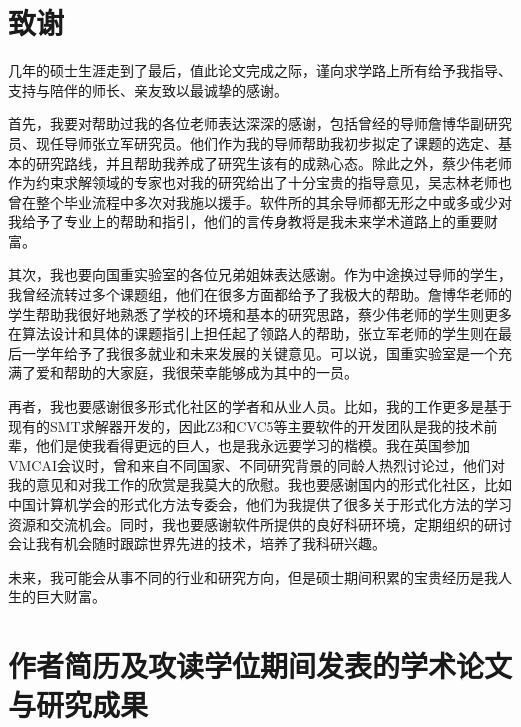 \chapter[致谢]{致\quad 谢}%

几年的硕士生涯走到了最后，值此论文完成之际，谨向求学路上所有给予我指导、支持与陪伴的师长、亲友致以最诚挚的感谢。

首先，我要对帮助过我的各位老师表达深深的感谢，包括曾经的导师詹博华副研究员、现任导师张立军研究员。他们作为我的导师帮助我初步拟定了课题的选定、基本的研究路线，并且帮助我养成了研究生该有的成熟心态。除此之外，蔡少伟老师作为约束求解领域的专家也对我的研究给出了十分宝贵的指导意见，吴志林老师也曾在整个毕业流程中多次对我施以援手。软件所的其余导师都无形之中或多或少对我给予了专业上的帮助和指引，他们的言传身教将是我未来学术道路上的重要财富。

其次，我也要向国重实验室的各位兄弟姐妹表达感谢。作为中途换过导师的学生，我曾经流转过多个课题组，他们在很多方面都给予了我极大的帮助。詹博华老师的学生帮助我很好地熟悉了学校的环境和基本的研究思路，蔡少伟老师的学生则更多在算法设计和具体的课题指引上担任起了领路人的帮助，张立军老师的学生则在最后一学年给予了我很多就业和未来发展的关键意见。可以说，国重实验室是一个充满了爱和帮助的大家庭，我很荣幸能够成为其中的一员。

再者，我也要感谢很多形式化社区的学者和从业人员。比如，我的工作更多是基于现有的SMT求解器开发的，因此Z3和CVC5等主要软件的开发团队是我的技术前辈，他们是使我看得更远的巨人，也是我永远要学习的楷模。我在英国参加VMCAI会议时，曾和来自不同国家、不同研究背景的同龄人热烈讨论过，他们对我的意见和对我工作的欣赏是我莫大的欣慰。我也要感谢国内的形式化社区，比如中国计算机学会的形式化方法专委会，他们为我提供了很多关于形式化方法的学习资源和交流机会。同时，我也要感谢软件所提供的良好科研环境，定期组织的研讨会让我有机会随时跟踪世界先进的技术，培养了我科研兴趣。

未来，我可能会从事不同的行业和研究方向，但是硕士期间积累的宝贵经历是我人生的巨大财富。


\chapter{作者简历及攻读学位期间发表的学术论文与研究成果}

